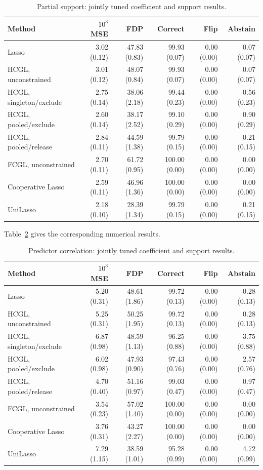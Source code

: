 \documentclass[11pt,a4paper]{article}
\begin{document}
\begin{table}[htbp]
\centering\small\setlength{\tabcolsep}{3pt}
\caption{Partial support: jointly tuned coefficient and support results.}
\label{tab:learned-metrics-partial-support}
\begin{tabular}{lrrrrr}\toprule
Method & $10^3$ MSE & FDP & Correct & Flip & Abstain\\\midrule
Lasso & 3.02 (0.12) & 47.83 (0.83) & 99.93 (0.07) & 0.00 (0.00) & 0.07 (0.07) \\
HCGL, unconstrained & 3.01 (0.12) & 48.07 (0.84) & 99.93 (0.07) & 0.00 (0.00) & 0.07 (0.07) \\
HCGL, singleton/exclude & 2.75 (0.14) & 38.06 (2.18) & 99.44 (0.23) & 0.00 (0.00) & 0.56 (0.23) \\
HCGL, pooled/exclude & 2.60 (0.14) & 38.17 (2.52) & 99.10 (0.29) & 0.00 (0.00) & 0.90 (0.29) \\
HCGL, pooled/release & 2.84 (0.11) & 44.59 (1.38) & 99.79 (0.15) & 0.00 (0.00) & 0.21 (0.15) \\
FCGL, unconstrained & 2.70 (0.11) & 61.72 (0.95) & 100.00 (0.00) & 0.00 (0.00) & 0.00 (0.00) \\
Cooperative Lasso & 2.59 (0.11) & 46.96 (1.36) & 100.00 (0.00) & 0.00 (0.00) & 0.00 (0.00) \\
UniLasso & 2.18 (0.10) & 28.39 (1.34) & 99.79 (0.15) & 0.00 (0.00) & 0.21 (0.15) \\
\bottomrule\end{tabular}
\end{table}

\noindent Table~\ref{tab:learned-metrics-predictor-correlation} gives the corresponding numerical results.

\begin{table}[htbp]
\centering\small\setlength{\tabcolsep}{3pt}
\caption{Predictor correlation: jointly tuned coefficient and support results.}
\label{tab:learned-metrics-predictor-correlation}
\begin{tabular}{lrrrrr}\toprule
Method & $10^3$ MSE & FDP & Correct & Flip & Abstain\\\midrule
Lasso & 5.20 (0.31) & 48.61 (1.86) & 99.72 (0.13) & 0.00 (0.00) & 0.28 (0.13) \\
HCGL, unconstrained & 5.25 (0.31) & 50.25 (1.95) & 99.72 (0.13) & 0.00 (0.00) & 0.28 (0.13) \\
HCGL, singleton/exclude & 6.87 (0.98) & 48.59 (1.13) & 96.25 (0.88) & 0.00 (0.00) & 3.75 (0.88) \\
HCGL, pooled/exclude & 6.02 (0.98) & 47.93 (0.90) & 97.43 (0.76) & 0.00 (0.00) & 2.57 (0.76) \\
HCGL, pooled/release & 4.70 (0.40) & 51.16 (0.97) & 99.03 (0.47) & 0.00 (0.00) & 0.97 (0.47) \\
FCGL, unconstrained & 3.54 (0.23) & 57.02 (1.40) & 100.00 (0.00) & 0.00 (0.00) & 0.00 (0.00) \\
Cooperative Lasso & 3.76 (0.31) & 43.27 (2.27) & 100.00 (0.00) & 0.00 (0.00) & 0.00 (0.00) \\
UniLasso & 7.29 (1.15) & 38.59 (1.01) & 95.28 (0.99) & 0.00 (0.00) & 4.72 (0.99) \\
\bottomrule\end{tabular}
\end{table}
\end{document}
